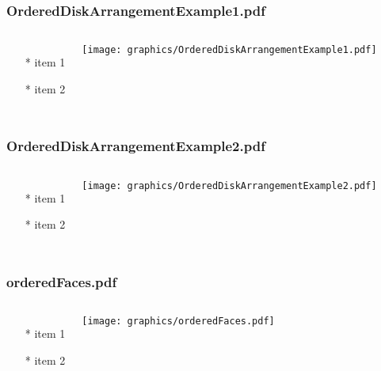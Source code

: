 \documentclass{beamer}
\begin{document}
\begin{frame} \frametitle{OrderedDiskArrangementExample1.pdf}
    \begin{columns}[c]
        \begin{itemize}
            \item[*] item 1
            \item[*] item 2
        \end{itemize}
        \begin{minipage}{\linewidth}
            \begin{center}
            \texttt{[image: graphics/OrderedDiskArrangementExample1.pdf]}
            \label{gfx:OrderedDiskArrangementExample1.pdf}
            \end{center}
        \end{minipage}
    \end{columns}
\end{frame}
\begin{frame} \frametitle{OrderedDiskArrangementExample2.pdf}
    \begin{columns}[c]
        \begin{itemize}
            \item[*] item 1
            \item[*] item 2
        \end{itemize}
        \begin{minipage}{\linewidth}
            \begin{center}
            \texttt{[image: graphics/OrderedDiskArrangementExample2.pdf]}
            \label{gfx:OrderedDiskArrangementExample2.pdf}
            \end{center}
        \end{minipage}
    \end{columns}
\end{frame}
\begin{frame} \frametitle{orderedFaces.pdf}
    \begin{columns}[c]
        \begin{itemize}
            \item[*] item 1
            \item[*] item 2
        \end{itemize}
        \begin{minipage}{\linewidth}
            \begin{center}
            \texttt{[image: graphics/orderedFaces.pdf]}
            \label{gfx:orderedFaces.pdf}
            \end{center}
        \end{minipage}
    \end{columns}
\end{frame}
\end{document}

